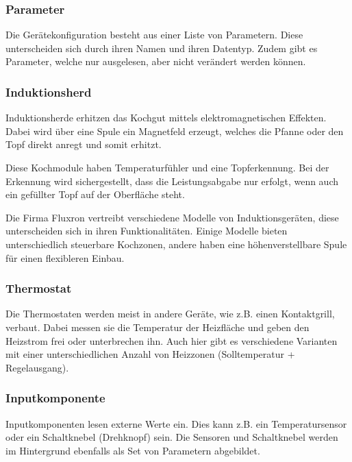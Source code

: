 \subsubsection{Parameter}
\label{subsubsec:Parameter}
Die Gerätekonfiguration besteht aus einer Liste von Parametern. Diese unterscheiden sich durch ihren Namen und ihren Datentyp. Zudem gibt es Parameter, welche nur ausgelesen, aber nicht verändert werden können.

\subsubsection{Induktionsherd}
\label{subsubsec:Induktionsherd}
Induktionsherde erhitzen das Kochgut mittels elektromagnetischen Effekten. Dabei wird über eine Spule ein Magnetfeld erzeugt, welches die Pfanne oder den Topf direkt anregt und somit erhitzt.

Diese Kochmodule haben Temperaturfühler und eine Topferkennung. Bei der Erkennung wird sichergestellt, dass die Leistungsabgabe nur erfolgt, wenn auch ein gefüllter Topf auf der Oberfläche steht.

Die Firma Fluxron vertreibt verschiedene Modelle von Induktionsgeräten, diese unterscheiden sich in ihren Funktionalitäten. Einige Modelle bieten unterschiedlich steuerbare Kochzonen, andere haben eine höhenverstellbare Spule für einen flexibleren Einbau.

\subsubsection{Thermostat}
\label{subsubsec:Thermostat}

Die Thermostaten werden meist in andere Geräte, wie z.B. einen Kontaktgrill, verbaut. Dabei messen sie die Temperatur der Heizfläche und geben den Heizstrom frei oder unterbrechen ihn. Auch hier gibt es verschiedene Varianten mit einer unterschiedlichen Anzahl von Heizzonen (Solltemperatur + Regelausgang).

\subsubsection{Inputkomponente}
\label{subsubsec:Inputkomponente}

Inputkomponenten lesen externe Werte ein. Dies kann z.B. ein Temperatursensor oder ein Schaltknebel (Drehknopf) sein. Die Sensoren und Schaltknebel werden im Hintergrund ebenfalls als Set von Parametern abgebildet.
